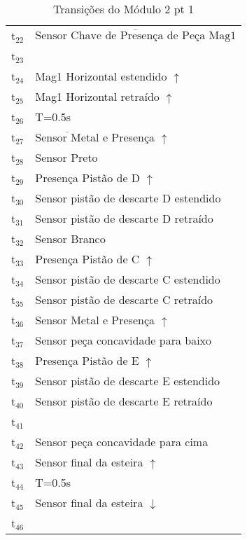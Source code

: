 \documentclass[11pt]{article}
\begin{document}
\begin{table}[htb]
\caption{Transições do Módulo 2 pt 1}
\centering
\begin{tabular}{ll}
t$_{\text{22}}$ & $\overline{\mbox{Sensor Chave de Presença de Peça Mag1}}$\\
t$_{\text{23}}$ & \\
t$_{\text{24}}$ & Mag1 Horizontal estendido $\uparrow$\\
t$_{\text{25}}$ & Mag1 Horizontal retraído $\uparrow$\\
t$_{\text{26}}$ & T=0.5s\\
t$_{\text{27}}$ & $\overline{\mbox{Sensor Metal}}$ e Presença $\uparrow$\\
t$_{\text{28}}$ & Sensor Preto\\
t$_{\text{29}}$ & Presença Pistão de D $\uparrow$\\
t$_{\text{30}}$ & Sensor pistão de descarte D estendido\\
t$_{\text{31}}$ & Sensor pistão de descarte D retraído\\
t$_{\text{32}}$ & Sensor Branco\\
t$_{\text{33}}$ & Presença Pistão de C $\uparrow$\\
t$_{\text{34}}$ & Sensor pistão de descarte C estendido\\
t$_{\text{35}}$ & Sensor pistão de descarte C retraído\\
t$_{\text{36}}$ & Sensor Metal e Presença $\uparrow$\\
t$_{\text{37}}$ & Sensor peça concavidade para baixo\\
t$_{\text{38}}$ & Presença Pistão de E $\uparrow$\\
t$_{\text{39}}$ & Sensor pistão de descarte E estendido\\
t$_{\text{40}}$ & Sensor pistão de descarte E retraído\\
t$_{\text{41}}$ & \\
t$_{\text{42}}$ & Sensor peça concavidade para cima\\
t$_{\text{43}}$ & Sensor final da esteira $\uparrow$\\
t$_{\text{44}}$ & T=0.5s\\
t$_{\text{45}}$ & Sensor final da esteira $\downarrow$\\
t$_{\text{46}}$ & \\
\end{tabular}
\end{table}
\end{document}
